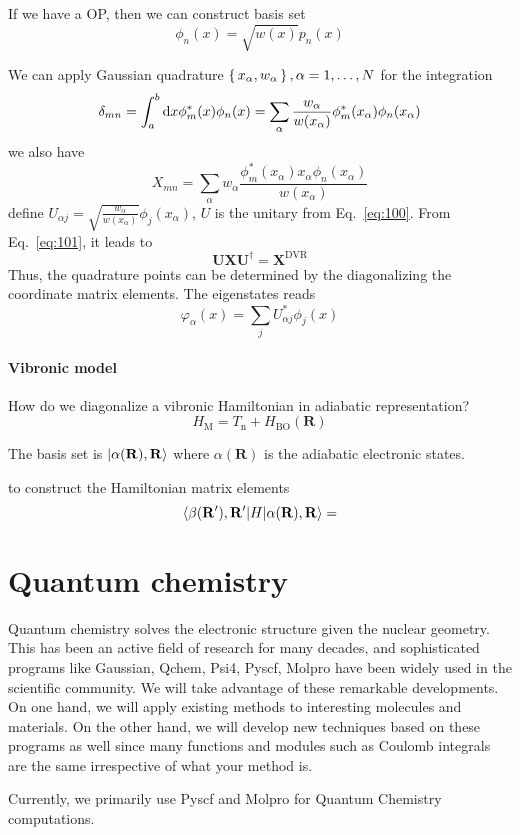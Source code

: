 \documentclass[a4paper,12pt]{book}
\newcommand{\be}{\begin{equation}}
\newcommand{\ee}{\end{equation}}
\newcommand{\eq}[1]{Eq.~\eqref{#1}}
\renewcommand{\bf}{\mathbf}
\renewcommand{\bf}{\mathbf}
\begin{document}
If we have a OP, then we can construct basis set
\be
\phi_n(x) = \sqrt{w(x)} p_n(x)
\ee

We can apply Gaussian quadrature $\set{x_\alpha, w_\alpha}, \alpha=1, \dots, N$ for the integration
\be
\delta_{mn} = \int_a^b \dif x \phi^*_m(x) \phi_n(x)	= \sum_\alpha \frac{w_\alpha}{{w(x_\alpha)}} {\phi_m^*(x_\alpha) \phi_n(x_\alpha)}
\label{eq:100}
\ee
we also have
\be
X_{mn} = \sum_\alpha w_\alpha \frac{\phi_m^*(x_\alpha)x_\alpha \phi_n(x_\alpha)}{w(x_\alpha)}
\label{eq:101}
\ee
define $U_{\alpha j} = \sqrt{\frac{w_\alpha}{w(x_\alpha)}} \phi_j(x_\alpha)$, $U$ is the unitary from \eq{eq:100}. From \eq{eq:101}, it leads to
\be
\bf U \bf X \bf U^\dag = \bf X^\text{DVR}
\ee
Thus, the quadrature points can be determined by the diagonalizing the coordinate matrix elements.
The eigenstates reads
\be
\varphi_\alpha(x) = \sum_j U_{\alpha j}^* \phi_j(x)
\ee





\subsubsection{Vibronic model}
How do we diagonalize a vibronic Hamiltonian in adiabatic representation?
\be H_\text{M} = T_\text{n} + H_\text{BO}(\bf R) \ee

The basis set is $\ket{\alpha(\bf R), \bf R}$ where $\alpha(\bf R)$ is the adiabatic electronic states.

to construct the Hamiltonian matrix elements
\be \braket{\beta(\bf R'), \bf R' | H | \alpha(\bf R), \bf R} =
\ee

\chapter{Quantum chemistry}
Quantum chemistry solves the electronic structure given the nuclear geometry. This has been an active field of research for many decades, and sophisticated programs like Gaussian, Qchem, Psi4, Pyscf, Molpro have been widely used in the scientific community. We will take advantage of these remarkable developments. On one hand, we will apply existing methods to interesting molecules and materials. On the other hand, we will develop new techniques based on these programs as well since many functions and modules such as Coulomb integrals are the same irrespective of what your method is.

Currently, we primarily use Pyscf and Molpro for Quantum Chemistry computations.
\end{document}
